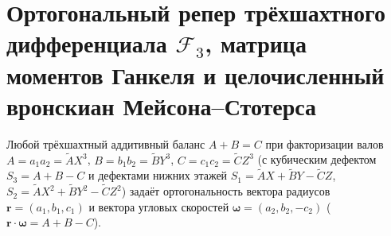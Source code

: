 \section{Ортогональный репер трёхшахтного дифференциала \texorpdfstring{$\mathcal{F}_3$}{F3}, матрица моментов Ганкеля и целочисленный вронскиан Мейсона--Стотерса}

Любой трёхшахтный аддитивный баланс $A + B = C$ при факторизации валов $A = a_1 a_2 = \widetilde{A}X^3$, $B = b_1 b_2 = \widetilde{B}Y^3$, $C = c_1 c_2 = \widetilde{C}Z^3$ (с кубическим дефектом $S_3 = A + B - C$ и дефектами нижних этажей $S_1 = \widetilde{A}X + \widetilde{B}Y - \widetilde{C}Z$, $S_2 = \widetilde{A}X^2 + \widetilde{B}Y^2 - \widetilde{C}Z^2$) задаёт ортогональность вектора радиусов $\mathbf{r} = (a_1, b_1, c_1)$ и вектора угловых скоростей $\mathbf{\omega} = (a_2, b_2, -c_2)$ ($\mathbf{r}\cdot\mathbf{\omega} = A + B - C$).

